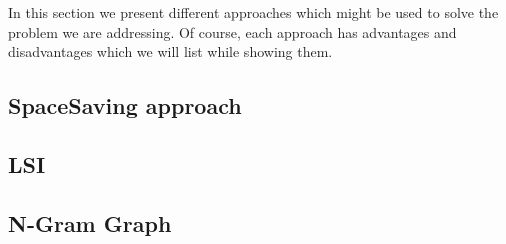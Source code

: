 In this section we present different approaches which might be used to solve the problem we are addressing. Of course, each approach has advantages and disadvantages which we will list while showing them.


\subsection*{SpaceSaving approach}


\subsection*{LSI}


\subsection*{N-Gram Graph}

